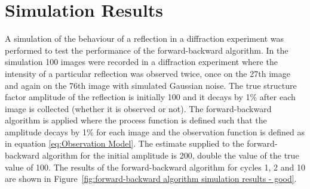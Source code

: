 \section{Simulation Results}
\label{sec:Simulation Results}
A simulation of the behaviour of a reflection in a diffraction experiment was performed to test the performance of the forward-backward algorithm.
In the simulation 100 images were recorded in a diffraction experiment where the intensity of a particular reflection was observed twice, once on the 27th image and again on the 76th image with simulated Gaussian noise.
The true structure factor amplitude of the reflection is initially 100 and it decays by 1\% after each image is collected (whether it is observed or not).
The forward-backward algorithm is applied where the process function is defined such that the amplitude decays by 1\% for each image and the observation function is defined as in equation \ref{eq:Observation Model}.
The estimate supplied to the forward-backward algorithm for the initial amplitude is 200, double the value of the true value of 100.
The results of the forward-backward algorithm for cycles 1, 2 and 10 are shown in Figure~\ref{fig:forward-backward algorithm simulation results - good}.
